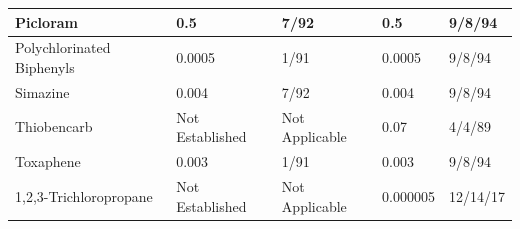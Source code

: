 \begin{table}[]
\begin{tabular}{|l|l|l|l|l|}
Picloram                                                                   & 0.5                                                                & 7/92                                                                                                              & 0.5                                                                                          & 9/8/94                                           \\ \hline
Polychlorinated   Biphenyls                                                & 0.0005                                                             & 1/91                                                                                                              & 0.0005                                                                                       & 9/8/94                                           \\ \hline
Simazine                                                                   & 0.004                                                              & 7/92                                                                                                              & 0.004                                                                                        & 9/8/94                                           \\ \hline
Thiobencarb                                                                & Not   Established                                                  & Not   Applicable                                                                                                  & 0.07                                                                                         & 4/4/89                                           \\ \hline
Toxaphene                                                                  & 0.003                                                              & 1/91                                                                                                              & 0.003                                                                                        & 9/8/94                                           \\ \hline
1,2,3-Trichloropropane                                                     & Not   Established                                                  & Not   Applicable                                                                                                  & 0.000005                                                                                     & 12/14/17                                         \\ \hline

\end{tabular}
\end{table}
